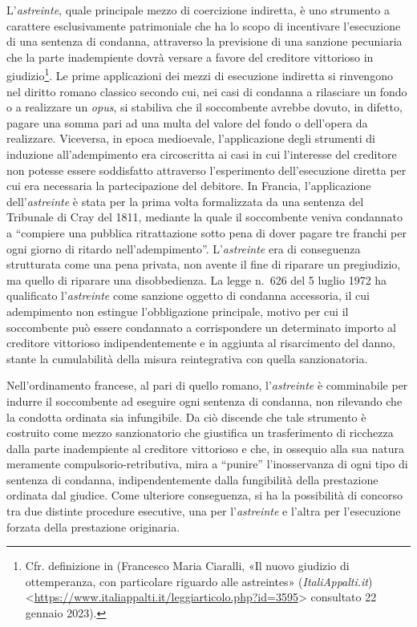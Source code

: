 \documentclass[12pt,it,a4paper,]{report}
\begin{document}
L'\emph{astreinte}, quale principale mezzo di coercizione indiretta, è
uno strumento a carattere esclusivamente patrimoniale che ha lo scopo di
incentivare l'esecuzione di una sentenza di condanna, attraverso la
previsione di una sanzione pecuniaria che la parte inadempiente dovrà
versare a favore del creditore vittorioso in giudizio\footnote{Cfr.
  definizione in (Francesco Maria Ciaralli, {«Il nuovo giudizio di
  ottemperanza, con particolare riguardo alle astreintes»}
  (\emph{ItaliAppalti.it})
  \textless{}\url{https://www.italiappalti.it/leggiarticolo.php?id=3595}\textgreater{}
  consultato 22 gennaio 2023).}. Le prime applicazioni dei mezzi di
esecuzione indiretta si rinvengono nel diritto romano classico secondo
cui, nei casi di condanna a rilasciare un fondo o a realizzare un
\emph{opus}, si stabiliva che il soccombente avrebbe dovuto, in difetto,
pagare una somma pari ad una multa del valore del fondo o dell'opera da
realizzare. Viceversa, in epoca medioevale, l'applicazione degli
strumenti di induzione all'adempimento era circoscritta ai casi in cui
l'interesse del creditore non potesse essere soddisfatto attraverso
l'esperimento dell'esecuzione diretta per cui era necessaria la
partecipazione del debitore. In Francia, l'applicazione
dell'\emph{astreinte} è stata per la prima volta formalizzata da una
sentenza del Tribunale di Cray del 1811, mediante la quale il
soccombente veniva condannato a ``compiere una pubblica ritrattazione
sotto pena di dover pagare tre franchi per ogni giorno di ritardo
nell'adempimento''. L'\emph{astreinte} era di conseguenza strutturata
come una pena privata, non avente il fine di riparare un pregiudizio, ma
quello di riparare una disobbedienza. La legge n.~626 del 5 luglio 1972
ha qualificato l'\emph{astreinte} come sanzione oggetto di condanna
accessoria, il cui adempimento non estingue l'obbligazione principale,
motivo per cui il soccombente può essere condannato a corrispondere un
determinato importo al creditore vittorioso indipendentemente e in
aggiunta al risarcimento del danno, stante la cumulabilità della misura
reintegrativa con quella sanzionatoria.

Nell'ordinamento francese, al pari di quello romano, l'\emph{astreinte}
è comminabile per indurre il soccombente ad eseguire ogni sentenza di
condanna, non rilevando che la condotta ordinata sia infungibile. Da ciò
discende che tale strumento è costruito come mezzo sanzionatorio che
giustifica un trasferimento di ricchezza dalla parte inadempiente al
creditore vittorioso e che, in ossequio alla sua natura meramente
compulsorio-retributiva, mira a ``punire'' l'inosservanza di ogni tipo
di sentenza di condanna, indipendentemente dalla fungibilità della
prestazione ordinata dal giudice. Come ulteriore conseguenza, si ha la
possibilità di concorso tra due distinte procedure esecutive, una per
l'\emph{astreinte} e l'altra per l'esecuzione forzata della prestazione
originaria.
\end{document}
